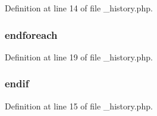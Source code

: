 Definition at line 14 of file \-\_\-history.\-php.

\hypertarget{__history_8php_a672d9707ef91db026c210f98cc601123}{
\subsubsection[{endforeach}]{\setlength{\rightskip}{0pt plus 5cm}endforeach}}\label{__history_8php_a672d9707ef91db026c210f98cc601123}


Definition at line 19 of file \-\_\-history.\-php.

\hypertarget{__history_8php_a82cd33ca97ff99f2fcc5e9c81d65251b}{
\subsubsection[{endif}]{\setlength{\rightskip}{0pt plus 5cm}endif}}\label{__history_8php_a82cd33ca97ff99f2fcc5e9c81d65251b}


Definition at line 15 of file \-\_\-history.\-php.

